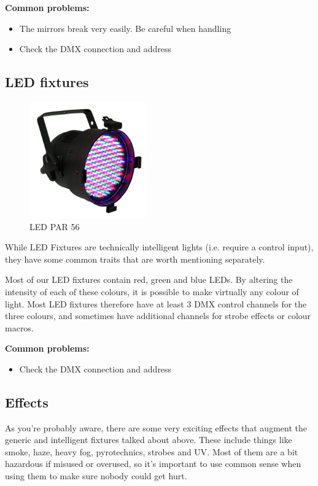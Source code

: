 \documentclass[14pt]{article} %
\begin{document}
\textbf{Common problems:}
\begin{itemize}
\item 	The mirrors break very easily. Be careful when handling
\item	Check the DMX connection and address
\end{itemize}

\subsection{LED fixtures}

\begin{figure}[h]
\begin{center}

\includegraphics[height=5cm]{ledpar.jpg}
\caption{LED PAR 56}
\label{fig:ledpar}

\end{center}
\end{figure}

While LED Fixtures are technically intelligent lights (i.e. require a control input), they have some common traits that are worth mentioning separately.

Most of our LED fixtures contain red, green and blue LEDs. By altering the intensity of each of these colours, it is possible to make virtually any colour of light. Most LED fixtures therefore have at least 3 DMX control channels for the three colours, and sometimes have additional channels for strobe effects or colour macros. 

\textbf{Common problems:}
\begin{itemize}
\item	Check the DMX connection and address
\end{itemize}

\subsection{Effects}

As you're probably aware, there are some very exciting effects that augment the generic and intelligent fixtures talked about above. These include things like smoke, haze, heavy fog, pyrotechnics, strobes and UV. Most of them are a bit hazardous if misused or overused, so it's important to use common sense when using them to make sure nobody could get hurt.
\end{document}
